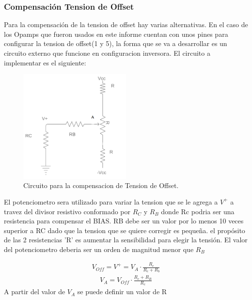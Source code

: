 \documentclass[a4paper]{article}
\begin{document}
\subsubsection{Compensación Tension de Offset}
Para la compensación de la tension de offset hay varias alternativas. En el caso de los Opamps que fueron usados en este informe cuentan con unos pines para configurar la tension de offset(1 y 5), la forma que se va a desarrollar es un circuito externo que funcione en configuracion inversora.
El circuito a implementar es el siguiente:
\begin{figure}[H]	
	\centering
	\includegraphics[width=0.5\textwidth]{imagenes/CompensacionOff.PNG}
	\caption{Circuito para la compensacion de Tension de Offset.}
	\label{fig:CompensacionOff}
\end{figure}
El potenciometro sera utilizado para variar la tension que se le agrega a $V^+$ a travez del divisor resistivo conformado por $R_C$ y $R_B$ donde Rc podria ser una resistencia para compensar el BIAS. RB debe ser un valor por lo menos 10 veces superior a RC dado que la tension que se quiere corregir es pequeña. el propósito de las 2 resistencias 'R' es aumentar la sensibilidad para elegir la tensión. El valor del potenciometro deberia ser un orden de magnitud menor que $R_B $

\begin{align}
V_{Off}=V^+ = V_A \cdot \frac{R_c}{R_c+R_b}  
\end{align}
\begin{align}
V_A =V_{Off} \cdot \frac{R_c+R_B}{R_c}
\end{align}
A partir del valor de $V_A$ se puede definir un valor de R
\end{document}

